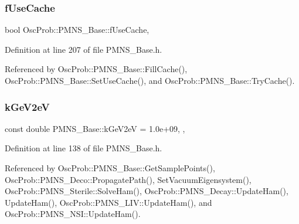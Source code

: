 \mbox{\label{classOscProb_1_1PMNS__Base_ad28c12ef897b5555eda509ea55c99107}} 
\subsubsection{\texorpdfstring{f\+Use\+Cache}{fUseCache}}
{\footnotesize\ttfamily bool Osc\+Prob\+::\+P\+M\+N\+S\+\_\+\+Base\+::f\+Use\+Cache\hspace{0.3cm}{\ttfamily [protected]}, {\ttfamily [inherited]}}



Definition at line 207 of file P\+M\+N\+S\+\_\+\+Base.\+h.



Referenced by Osc\+Prob\+::\+P\+M\+N\+S\+\_\+\+Base\+::\+Fill\+Cache(), Osc\+Prob\+::\+P\+M\+N\+S\+\_\+\+Base\+::\+Set\+Use\+Cache(), and Osc\+Prob\+::\+P\+M\+N\+S\+\_\+\+Base\+::\+Try\+Cache().

\mbox{\label{classOscProb_1_1PMNS__Base_ad36a0a6bf58d6ec093d3947784bd89e9}} 
\subsubsection{\texorpdfstring{k\+Ge\+V2eV}{kGeV2eV}}
{\footnotesize\ttfamily const double P\+M\+N\+S\+\_\+\+Base\+::k\+Ge\+V2eV = 1.\+0e+09\hspace{0.3cm}{\ttfamily [static]}, {\ttfamily [protected]}, {\ttfamily [inherited]}}



Definition at line 138 of file P\+M\+N\+S\+\_\+\+Base.\+h.



Referenced by Osc\+Prob\+::\+P\+M\+N\+S\+\_\+\+Base\+::\+Get\+Sample\+Points(), Osc\+Prob\+::\+P\+M\+N\+S\+\_\+\+Deco\+::\+Propagate\+Path(), Set\+Vacuum\+Eigensystem(), Osc\+Prob\+::\+P\+M\+N\+S\+\_\+\+Sterile\+::\+Solve\+Ham(), Osc\+Prob\+::\+P\+M\+N\+S\+\_\+\+Decay\+::\+Update\+Ham(), Update\+Ham(), Osc\+Prob\+::\+P\+M\+N\+S\+\_\+\+L\+I\+V\+::\+Update\+Ham(), and Osc\+Prob\+::\+P\+M\+N\+S\+\_\+\+N\+S\+I\+::\+Update\+Ham().

